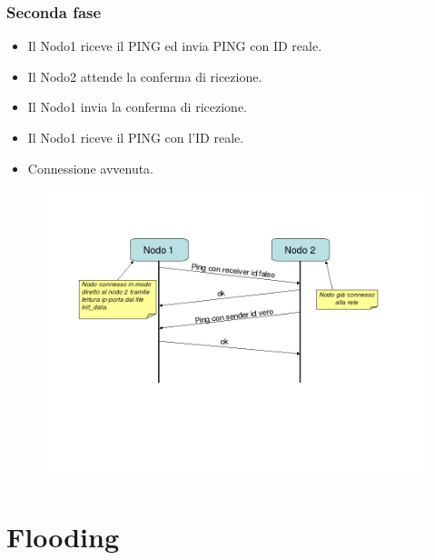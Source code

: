 \documentclass[a4paper,italian,12pt]{beamer}
\begin{document}
			\begin{frame}
				\frametitle{Seconda fase}
				\begin{itemize}
					\item Il Nodo1 riceve il PING ed invia PING con ID reale.
					\item Il Nodo2 attende la conferma di ricezione.
					\item Il Nodo1 invia la conferma di ricezione.
					\item Il Nodo1 riceve il PING con l'ID reale.
					\item Connessione avvenuta.
				\end{itemize}
				\begin{figure}[H]
					\begin{center}
						\includegraphics[scale=0.3]{etc/Bootstrap.png}
					\end{center}
				\end{figure}
			\end{frame}
	\section{Flooding}
\end{document}
